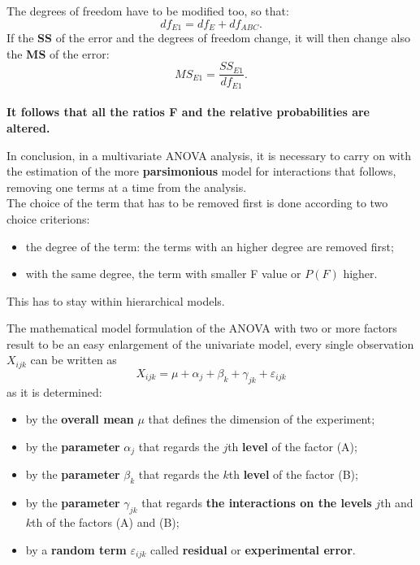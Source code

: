 \begin{frame}
  \vspace*{.25cm} 
  The degrees of freedom have to be modified too, so that:
  $$ df_{E1}=df_E+df_{ABC} \mbox{.} $$
  If the \textbf{SS} of the error and the degrees of freedom change, it will then change also the \textbf{MS} of the error:
  $$ MS_{E1}=\frac{SS_{E1}}{df_{E1}} \mbox{.} $$\\
  \vspace*{.5cm}
  \textbf{It follows that all the ratios F and the relative probabilities are altered.}
\end{frame}

\begin{frame}
  \vspace*{.5cm} 
  In conclusion, in a multivariate ANOVA analysis, it is necessary to carry on with the estimation of the more \textbf{parsimonious} model for interactions that follows, removing one terms at a time from the analysis.\\
  \vspace*{.5cm}
  The choice of the term that has to be removed first is done according to two choice criterions:
  \begin{itemize}
    \item the degree of the term: the terms with an higher degree are removed first;
    \item with the same degree, the term with smaller F value or $ P(F) $ higher.
  \end{itemize}
  \vspace*{.5cm}
  This has to stay within hierarchical models.
\end{frame}


\begin{frame}
  \vspace*{.25cm} 
  The mathematical model formulation of the ANOVA with two or more factors result to be an easy enlargement of the univariate model, every single observation {\boldmath $ X_{ijk} $} can be written as
  $$ X_{ijk}=\mu+\alpha_{j}+\beta_{k}+\gamma_{jk}+\varepsilon_{ijk} $$
  as it is determined:
  \begin{itemize}
    \item by the \textbf{overall mean} {\boldmath$\mu$} that defines the dimension of the experiment;
    \item by the \textbf{parameter} {\boldmath$\alpha_{j}$} that regards the $ j $th \textbf{level} of the factor (A);
    \item by the \textbf{parameter} {\boldmath$\beta_{k}$} that regards the  $ k $th \textbf{level} of the factor (B);
    \item by the \textbf{parameter}  {\boldmath$\gamma_{jk}$} that regards \textbf{the interactions on the levels} $ j $th and $ k $th of the factors (A) and (B);
    \item by a \textbf{random term} {\boldmath$\varepsilon_{ijk}$} called \textbf{residual} or \textbf{experimental error}.
   \end{itemize}
\end{frame}

